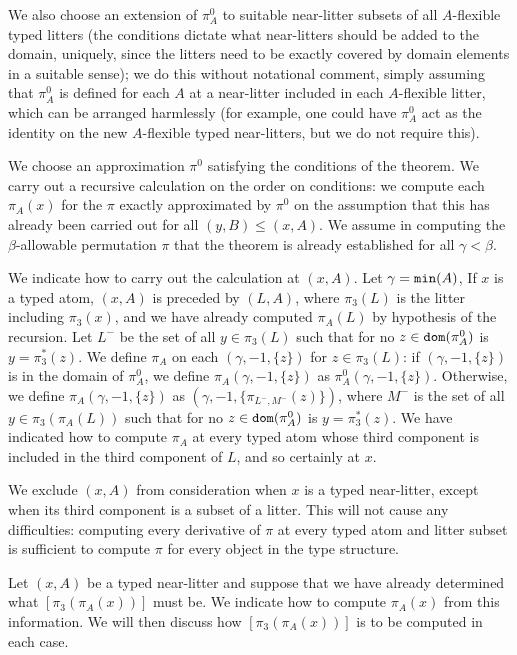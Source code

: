 \documentclass[112pt]{article}
\begin{document}
\begin{description}
We also choose an extension of $\pi^0_A$ to suitable near-litter subsets of all $A$-flexible typed litters (the conditions dictate what near-litters should be added to the domain, uniquely, since the litters need to be exactly covered by domain elements in a suitable sense);  we do this without notational comment, simply assuming that $\pi^0_A$ is defined for each $A$ at a near-litter included in each $A$-flexible litter, which can be arranged harmlessly
(for example, one could have $\pi^0_A$ act as the identity on the new $A$-flexible typed near-litters, but we do not require this).

We choose an approximation $\pi^0$ satisfying the conditions of the theorem.  We carry out a recursive calculation on the order on conditions:
we compute each $\pi_A(x)$ for the $\pi$ exactly approximated by $\pi^0$ on the assumption that this has already been carried out for all $(y,B)\leq (x,A)$.  We assume in computing the $\beta$-allowable permutation $\pi$ that the theorem is already established for all $\gamma<\beta$.

We indicate how to carry out the calculation at $(x,A)$.  Let $\gamma = {\tt min}(A)$,  If $x$ is a typed atom, $(x,A)$ is preceded by $(L,A)$, where $\pi_3(L)$
is the litter including $\pi_3(x)$, and we have already computed $\pi_A(L)$ by hypothesis of the recursion.  Let $L^-$ be the set of all $y\in \pi_3(L)$ such that for no $z \in {\tt dom}(\pi^0_A)$ is $y=\pi_3^*(z)$.  We define $\pi_{A}$ on each $(\gamma,-1,\{z\})$ for $z \in \pi_3(L)$:
if $(\gamma,-1,\{z\})$ is in the domain of $\pi^0_A$, we define $\pi_A(\gamma,-1,\{z\})$ as $\pi^0_A(\gamma,-1,\{z\})$.  Otherwise, we define
$\pi_A(\gamma,-1,\{z\})$ as $(\gamma,-1,\{\pi_{L^-,M^-}(z)\})$, where $M^-$ is the set of all $y\in \pi_3(\pi_A(L))$ such that for no $z \in {\tt dom}(\pi^0_A)$ is $y=\pi_3^*(z)$.   We have indicated how to compute $\pi_A$ at every typed atom whose third component is included in the third component of $L$, and so certainly at $x$.

We exclude $(x,A)$ from consideration when $x$ is a typed near-litter, except when its third component is a subset of a litter.  This will not cause
any difficulties:  computing every derivative of $\pi$ at every typed atom and litter subset is sufficient to compute $\pi$ for every object in the type structure.

Let $(x,A)$ be a typed near-litter and suppose that we have already determined what $[\pi_3(\pi_A(x))]$ must be.   We indicate how
to compute $\pi_A(x)$ from this information.  We will then discuss how $[\pi_3(\pi_A(x))]$ is to be computed in each case.


\end{description}
\end{document}
